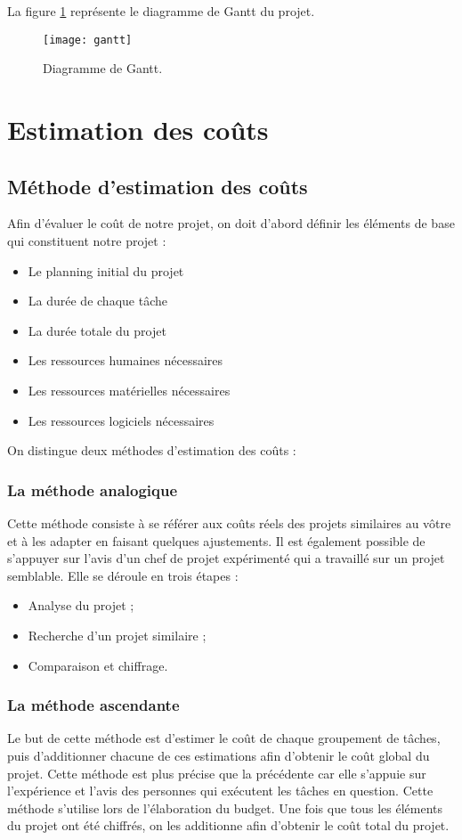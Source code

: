 La figure \ref{fig:gantt} représente le diagramme de Gantt du projet.


\begin{figure}[H]
    \centering
    \texttt{[image: gantt]}
    \caption{Diagramme de Gantt.}
    \label{fig:gantt}
\end{figure}


\section{Estimation des coûts}
\subsection{Méthode d’estimation des coûts}
Afin d’évaluer le coût de notre projet, on doit d’abord définir les éléments de base qui constituent notre projet : 
\begin{itemize}
    \item Le planning initial du projet
    \item La durée de chaque tâche
    \item La durée totale du projet
    \item Les ressources humaines nécessaires
    \item Les ressources matérielles nécessaires
    \item Les ressources logiciels nécessaires
\end{itemize}

On distingue deux méthodes d’estimation des coûts :
\subsubsection{La méthode analogique}
Cette méthode consiste à se référer aux coûts réels des projets similaires au vôtre et à les adapter en faisant quelques ajustements. Il est également possible de s’appuyer sur l’avis d’un chef de projet expérimenté qui a travaillé sur un projet semblable. Elle se déroule en trois étapes :
\begin{itemize}
    \item Analyse du projet ;
    \item Recherche d’un projet similaire ;
    \item Comparaison et chiffrage.
\end{itemize}

\subsubsection{La méthode ascendante}
Le but de cette méthode est d’estimer le coût de chaque groupement de tâches, puis d’additionner chacune de ces estimations afin d’obtenir le coût global du projet. Cette méthode est plus précise que la précédente car elle s’appuie sur l’expérience et l’avis des personnes qui exécutent les tâches en question. Cette méthode s’utilise lors de l’élaboration du budget. Une fois que tous les éléments du projet ont été chiffrés, on les additionne afin d’obtenir le coût total du projet.


